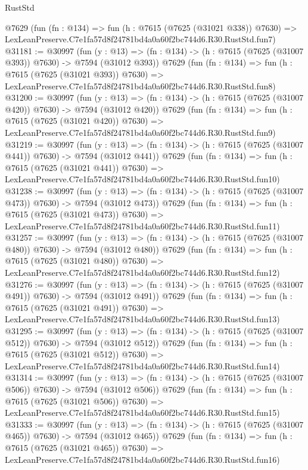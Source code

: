 \begin{lexlean}{RustStd}
\begin{coremodule}
    @7629
    (fun (fn : @134) =>
    fun (h : @7615 (@7625 (@31021 @338)) @7630) =>
    LexLeanPreserve.C7e1fa57d8f24781bd4a0a60f2bc744d6.R30.RustStd.fun7)
@31181 := @30997
    (fun (y : @13) => (fn : @134) -> (h : @7615 (@7625 (@31007 @393)) @7630) -> @7594 (@31012 @393))
    @7629
    (fun (fn : @134) =>
    fun (h : @7615 (@7625 (@31021 @393)) @7630) =>
    LexLeanPreserve.C7e1fa57d8f24781bd4a0a60f2bc744d6.R30.RustStd.fun8)
@31200 := @30997
    (fun (y : @13) => (fn : @134) -> (h : @7615 (@7625 (@31007 @420)) @7630) -> @7594 (@31012 @420))
    @7629
    (fun (fn : @134) =>
    fun (h : @7615 (@7625 (@31021 @420)) @7630) =>
    LexLeanPreserve.C7e1fa57d8f24781bd4a0a60f2bc744d6.R30.RustStd.fun9)
@31219 := @30997
    (fun (y : @13) => (fn : @134) -> (h : @7615 (@7625 (@31007 @441)) @7630) -> @7594 (@31012 @441))
    @7629
    (fun (fn : @134) =>
    fun (h : @7615 (@7625 (@31021 @441)) @7630) =>
    LexLeanPreserve.C7e1fa57d8f24781bd4a0a60f2bc744d6.R30.RustStd.fun10)
@31238 := @30997
    (fun (y : @13) => (fn : @134) -> (h : @7615 (@7625 (@31007 @473)) @7630) -> @7594 (@31012 @473))
    @7629
    (fun (fn : @134) =>
    fun (h : @7615 (@7625 (@31021 @473)) @7630) =>
    LexLeanPreserve.C7e1fa57d8f24781bd4a0a60f2bc744d6.R30.RustStd.fun11)
@31257 := @30997
    (fun (y : @13) => (fn : @134) -> (h : @7615 (@7625 (@31007 @480)) @7630) -> @7594 (@31012 @480))
    @7629
    (fun (fn : @134) =>
    fun (h : @7615 (@7625 (@31021 @480)) @7630) =>
    LexLeanPreserve.C7e1fa57d8f24781bd4a0a60f2bc744d6.R30.RustStd.fun12)
@31276 := @30997
    (fun (y : @13) => (fn : @134) -> (h : @7615 (@7625 (@31007 @491)) @7630) -> @7594 (@31012 @491))
    @7629
    (fun (fn : @134) =>
    fun (h : @7615 (@7625 (@31021 @491)) @7630) =>
    LexLeanPreserve.C7e1fa57d8f24781bd4a0a60f2bc744d6.R30.RustStd.fun13)
@31295 := @30997
    (fun (y : @13) => (fn : @134) -> (h : @7615 (@7625 (@31007 @512)) @7630) -> @7594 (@31012 @512))
    @7629
    (fun (fn : @134) =>
    fun (h : @7615 (@7625 (@31021 @512)) @7630) =>
    LexLeanPreserve.C7e1fa57d8f24781bd4a0a60f2bc744d6.R30.RustStd.fun14)
@31314 := @30997
    (fun (y : @13) => (fn : @134) -> (h : @7615 (@7625 (@31007 @506)) @7630) -> @7594 (@31012 @506))
    @7629
    (fun (fn : @134) =>
    fun (h : @7615 (@7625 (@31021 @506)) @7630) =>
    LexLeanPreserve.C7e1fa57d8f24781bd4a0a60f2bc744d6.R30.RustStd.fun15)
@31333 := @30997
    (fun (y : @13) => (fn : @134) -> (h : @7615 (@7625 (@31007 @465)) @7630) -> @7594 (@31012 @465))
    @7629
    (fun (fn : @134) =>
    fun (h : @7615 (@7625 (@31021 @465)) @7630) =>
    LexLeanPreserve.C7e1fa57d8f24781bd4a0a60f2bc744d6.R30.RustStd.fun16)

\end{coremodule}
\end{lexlean}

